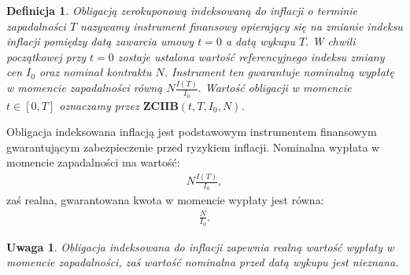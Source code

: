 \documentclass{mini}
\theoremstyle{mythstyle}
\newtheorem{Definicja}{Definicja}[chapter]
\newtheorem{Uwaga}{Uwaga}[chapter]
\begin{document}
	\begin{Definicja}
		Obligacją zerokuponową indeksowaną do inflacji o terminie zapadalności $T$ nazywamy instrument finansowy opierający się na zmianie indeksu inflacji pomiędzy datą zawarcia umowy $t = 0$ a datą wykupu $T$. W chwili początkowej przy $t = 0$  zostaje ustalona wartość referencyjnego indeksu zmiany cen $I_0$ oraz nominał kontraktu $N$. Instrument ten gwarantuje nominalną wypłatę w momencie zapadalności równą $N\frac{I(T)}{I_0}.$ Wartość obligacji w momencie $t \in [0,T]$ oznaczamy przez $\mathbf{ZCIIB}(t,T,I_0,N)$.
	\end{Definicja}
	Obligacja indeksowana inflacją jest podstawowym instrumentem finansowym gwarantującym zabezpieczenie przed ryzykiem inflacji. Nominalna wypłata w momencie zapadalności ma wartość:
	\begin{eqnarray}
		N\frac{I(T)}{I_0},
	\end{eqnarray}
	zaś realna, gwarantowana kwota w momencie wypłaty jest równa:
	\begin{eqnarray}
		 \frac{N}{I_0}.
	 \end{eqnarray}
 
	 \begin{Uwaga}
		 Obligacja indeksowana do inflacji zapewnia realną wartość wypłaty w momencie zapadalności, zaś wartość nominalna przed datą wykupu jest nieznana.
	 \end{Uwaga}
		
\end{document}
